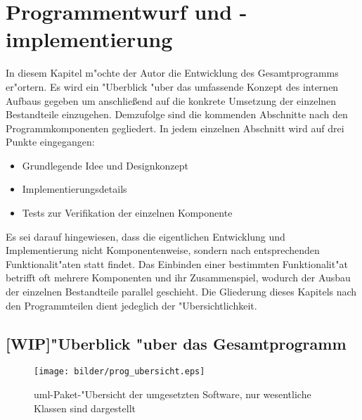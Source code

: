 \chapter{Programmentwurf und -implementierung}
\label{chap:entwurf}

In diesem Kapitel m"ochte der Autor die Entwicklung des Gesamtprogramms er"ortern.
Es wird ein "Uberblick "uber das umfassende Konzept des internen Aufbaus gegeben um anschlie\ss end auf die konkrete Umsetzung der einzelnen Bestandteile einzugehen.
Demzufolge sind die kommenden Abschnitte nach den Programmkomponenten gegliedert.
In jedem einzelnen Abschnitt wird auf drei Punkte eingegangen:
\begin{itemize}
	\item Grundlegende Idee und Designkonzept
	\item Implementierungsdetails
	\item Tests zur Verifikation der einzelnen Komponente
\end{itemize}
Es sei darauf hingewiesen, dass die eigentlichen Entwicklung und Implementierung nicht Komponentenweise, sondern nach entsprechenden Funktionalit"aten statt findet.
Das Einbinden einer bestimmten Funktionalit"at betrifft oft mehrere Komponenten und ihr Zusammenspiel, wodurch der Ausbau der einzelnen Bestandteile parallel geschieht.
Die Gliederung dieses Kapitels nach den Programmteilen dient jedeglich der "Ubersichtlichkeit.

\section{[WIP]"Uberblick "uber das Gesamtprogramm}

\begin{figure}[htb]
\centering
\texttt{[image: bilder/prog\_ubersicht.eps]}
\caption[\acs{uml}-Paket-"Ubersicht der umgesetzten Software]{\ac{uml}-Paket-"Ubersicht der umgesetzten Software, nur wesentliche Klassen sind dargestellt}
\label{pic:paket_ubersicht}
\end{figure}

